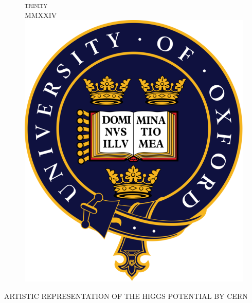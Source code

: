 \documentclass[11pt,a4paper]{report}
\begin{document}
\begin{titlepage}
\vfil
\begin{figure}[b]
\centering
\textsc{\color{white} trinity \\MMXXIV}\\[1cm]
\includegraphics[scale=0.15]{Images/Oxford_Logo.png}
\end{figure}
\end{titlepage}

\newpage
{
\begin{titlepage}
\AddToShipoutPicture*{\AddBackgroundPic}
\begingroup
\hypersetup{citecolor=silver}
\vspace*{\fill}
\begin{center}
\hspace{-1cm}
\textsc{\color{silver} ARTISTIC REPRESENTATION OF THE HIGGS POTENTIAL BY CERN \cite{Dominguez:2815837}}
\end{center}
\endgroup
\end{titlepage}
}

\restoregeometry
\pagecolor{white}    
\end{document}

